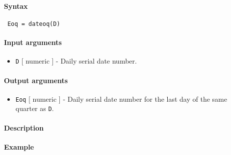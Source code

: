 


	\paragraph{Syntax}
 
 \begin{verbatim}
 Eoq = dateoq(D)
 \end{verbatim}
 
 \paragraph{Input arguments}
 
 \begin{itemize}
 \item
   \texttt{D} {[} numeric {]} - Daily serial date number.
 \end{itemize}
 
 \paragraph{Output arguments}
 
 \begin{itemize}
 \item
   \texttt{Eoq} {[} numeric {]} - Daily serial date number for the last
   day of the same quarter as \texttt{D}.
 \end{itemize}
 
 \paragraph{Description}
 
 \paragraph{Example}


